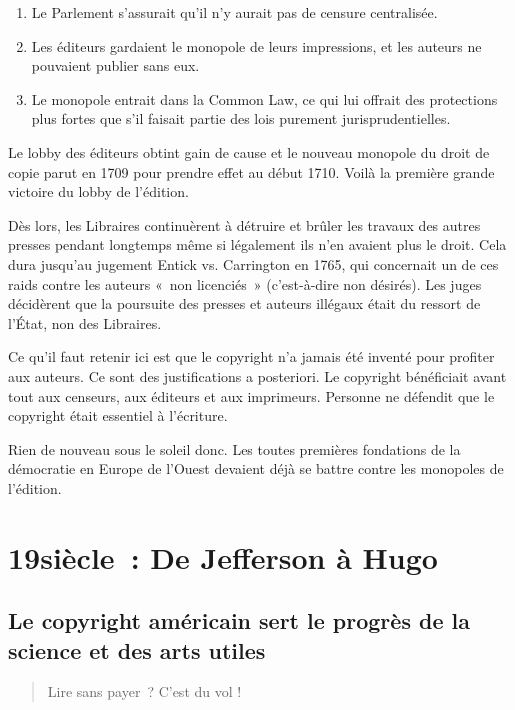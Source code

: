 \begin{enumerate}
\item 
Le Parlement s'assurait qu'il n'y aurait pas de censure centralisée. \item
Les éditeurs gardaient le monopole de leurs impressions, et les
auteurs ne pouvaient publier sans eux. \item
Le monopole entrait dans la Common Law, ce qui lui offrait des protections plus fortes que s'il faisait partie des lois purement
jurisprudentielles.\end{enumerate}

Le lobby des éditeurs obtint gain de cause et le nouveau monopole du droit de copie parut en 1709 pour prendre effet au début 1710. Voilà la première grande victoire du lobby de l'édition.

Dès lors, les Libraires continuèrent à détruire et brûler les travaux des autres presses pendant longtemps même si légalement ils n'en avaient plus le droit. Cela dura jusqu'au jugement Entick vs.
Carrington en 1765, qui concernait un de ces raids contre les auteurs «~non licenciés~» (c'est-à-dire non désirés).
Les juges décidèrent que la poursuite des presses et auteurs illégaux était du
ressort de l'État, non des Libraires.

Ce qu'il faut retenir ici est que le copyright n'a jamais été inventé pour profiter aux auteurs. Ce sont des justifications a posteriori. Le copyright bénéficiait avant tout aux censeurs, aux éditeurs
et aux imprimeurs. Personne ne défendit que le copyright était essentiel à
l'écriture.

Rien de nouveau sous le soleil donc. Les toutes premières fondations de la démocratie en Europe de l'Ouest devaient déjà se battre contre les monopoles de l'édition.

\section{19\ieme siècle~: De Jefferson à Hugo}
\subsection{Le copyright américain sert le progrès de la science et des arts utiles}
\begin{quotation}
 Lire sans payer~? C'est du vol !
\end{quotation}

